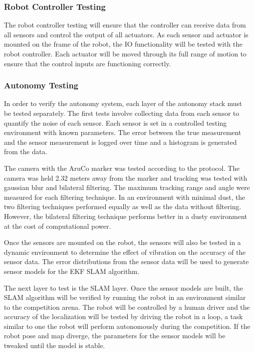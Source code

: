 \documentclass[class=article, crop=false]{standalone}
\begin{document}
		\subsubsection{Robot Controller Testing}
		
		The robot controller testing will ensure that the controller can receive data from all sensors and control the output of all actuators. As each sensor and actuator is mounted on the frame of the robot, the IO functionality will be tested with the robot controller. Each actuator will be moved through its full range of motion to ensure that the control inputs are functioning correctly.
		
		\subsubsection{Autonomy Testing}
		
		In order to verify the autonomy system, each layer of the autonomy stack must be tested separately. The first tests involve collecting data from each sensor to quantify the noise of each sensor. Each sensor is set in a controlled testing environment with known parameters. The error between the true measurement and the sensor measurement is logged over time and a histogram is generated from the data.
		
	The camera with the AruCo marker was tested according to the protocol. The camera was held 2.32 meters away from the marker and tracking was tested with gaussian blur and bilateral filtering. The maximum tracking range and angle were measured for each filtering technique. In an environment with minimal dust, the two filtering techniques performed equally as well as the data without filtering. However, the bilateral filtering technique performs better in a dusty environment at the cost of computational power.
	
	Once the sensors are mounted on the robot, the sensors will also be tested in a dynamic environment to determine the effect of vibration on the accuracy of the sensor data. The error distributions from the sensor data will be used to generate sensor models for the EKF SLAM algorithm.
	
	The next layer to test is the SLAM layer. Once the sensor models are built, the SLAM algorithm will be verified by running the robot in an environment similar to the competition arena. The robot will be controlled by a human driver and the accuracy of the localization will be tested by driving the robot in a loop, a task similar to one the robot will perform autonomously during the competition. If the robot pose and map diverge, the parameters for the sensor models will be tweaked until the model is stable.
	
\end{document}
